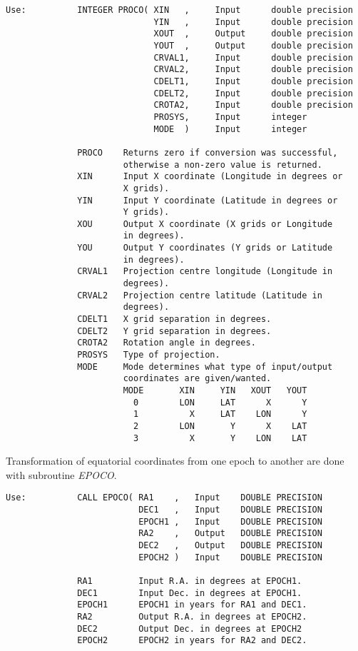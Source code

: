 \begin{verbatim}
Use:          INTEGER PROCO( XIN   ,     Input      double precision
                             YIN   ,     Input      double precision
                             XOUT  ,     Output     double precision
                             YOUT  ,     Output     double precision
                             CRVAL1,     Input      double precision
                             CRVAL2,     Input      double precision
                             CDELT1,     Input      double precision
                             CDELT2,     Input      double precision
                             CROTA2,     Input      double precision
                             PROSYS,     Input      integer
                             MODE  )     Input      integer

              PROCO    Returns zero if conversion was successful,
                       otherwise a non-zero value is returned.
              XIN      Input X coordinate (Longitude in degrees or
                       X grids).
              YIN      Input Y coordinate (Latitude in degrees or
                       Y grids).
              XOU      Output X coordinate (X grids or Longitude
                       in degrees).
              YOU      Output Y coordinates (Y grids or Latitude
                       in degrees).
              CRVAL1   Projection centre longitude (Longitude in
                       degrees).
              CRVAL2   Projection centre latitude (Latitude in
                       degrees).
              CDELT1   X grid separation in degrees.
              CDELT2   Y grid separation in degrees.
              CROTA2   Rotation angle in degrees.
              PROSYS   Type of projection.
              MODE     Mode determines what type of input/output
                       coordinates are given/wanted.
                       MODE       XIN     YIN   XOUT   YOUT
                         0        LON     LAT      X      Y
                         1          X     LAT    LON      Y
                         2        LON       Y      X    LAT
                         3          X       Y    LON    LAT
\end{verbatim}

Transformation of equatorial coordinates from one epoch to another are
done with subroutine {\sl EPOCO\/}.

\begin{verbatim}
Use:          CALL EPOCO( RA1    ,   Input    DOUBLE PRECISION
                          DEC1   ,   Input    DOUBLE PRECISION
                          EPOCH1 ,   Input    DOUBLE PRECISION
                          RA2    ,   Output   DOUBLE PRECISION
                          DEC2   ,   Output   DOUBLE PRECISION
                          EPOCH2 )   Input    DOUBLE PRECISION

              RA1         Input R.A. in degrees at EPOCH1.
              DEC1        Input Dec. in degrees at EPOCH1.
              EPOCH1      EPOCH1 in years for RA1 and DEC1.
              RA2         Output R.A. in degrees at EPOCH2.
              DEC2        Output Dec. in degrees at EPOCH2
              EPOCH2      EPOCH2 in years for RA2 and DEC2.
\end{verbatim}

